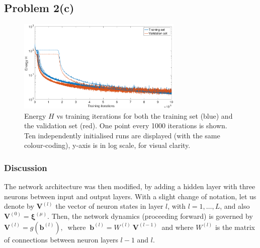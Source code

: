 \documentclass[12pt,titlepage]{article}
\begin{document}
\clearpage

\subsection*{Problem 2(c)}
\vspace*{-0.3cm}
\begin{figure}[H]
\centering
\includegraphics[width=0.7\textwidth]{../Figures/oneHL_energy.pdf}
\caption{\footnotesize Energy $H$ vs training iterations for both the training set (blue) and the validation set (red). One point every 1000 iterations is shown. Ten independently initialised runs are displayed (with the same colour-coding), y-axis is in log scale, for visual clarity.}
\label{fig:2c}
\end{figure}

\vspace*{-0.3cm}
\subsubsection*{Discussion}
\vspace*{-0.2cm}
The network architecture was then modified, by adding a hidden layer with three neurons between input and output layers. With a slight change of notation, let us denote by $\bm{V}^{(l)}$ the vector of neuron states in layer $l$, with $l = 1,\ldots,L$, and also $\bm{V}^{(0)} = \bm{\xi}^{(\mu)}$. Then, the network dynamics (proceeding forward) is governed by $\bm{V}^{(l)} = g(\bm{b}^{(l)}), \ $ where $\ \bm{b}^{(l)} = W^{(l)} \ \bm{V}^{(l-1)}\ $ and where $W^{(l)}$ is the matrix of connections between neuron layers $l-1$ and $l$.
\end{document}

